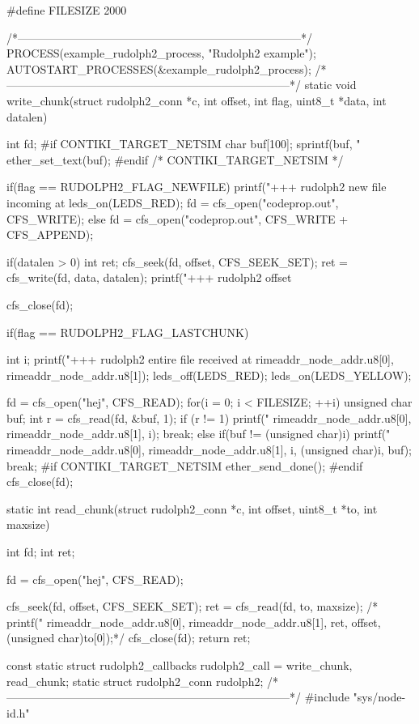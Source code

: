 \begin{DoxyCodeInclude}
#define FILESIZE 2000

/*---------------------------------------------------------------------------*/
PROCESS(example_rudolph2_process, "Rudolph2 example");
AUTOSTART_PROCESSES(&example_rudolph2_process);
/*---------------------------------------------------------------------------*/
static void
write_chunk(struct rudolph2_conn *c, int offset, int flag,
            uint8_t *data, int datalen)
{
  int fd;
#if CONTIKI_TARGET_NETSIM
  {
    char buf[100];
    sprintf(buf, "%
    ether_set_text(buf);
  }
#endif /* CONTIKI_TARGET_NETSIM */

  if(flag == RUDOLPH2_FLAG_NEWFILE) {
    printf("+++ rudolph2 new file incoming at %
    leds_on(LEDS_RED);
    fd = cfs_open("codeprop.out", CFS_WRITE);
  } else {
    fd = cfs_open("codeprop.out", CFS_WRITE + CFS_APPEND);
  }
  
  if(datalen > 0) {
    int ret;
    cfs_seek(fd, offset, CFS_SEEK_SET);
    ret = cfs_write(fd, data, datalen);
    printf("+++ rudolph2 offset %
  }

  cfs_close(fd);

  if(flag == RUDOLPH2_FLAG_LASTCHUNK) {
    int i;
    printf("+++ rudolph2 entire file received at %
           rimeaddr_node_addr.u8[0], rimeaddr_node_addr.u8[1]);
    leds_off(LEDS_RED);
    leds_on(LEDS_YELLOW);

    fd = cfs_open("hej", CFS_READ);
    for(i = 0; i < FILESIZE; ++i) {
      unsigned char buf;
      int r = cfs_read(fd, &buf, 1);
      if (r != 1) {
        printf("%
               rimeaddr_node_addr.u8[0], rimeaddr_node_addr.u8[1],
               i);
        break;
      }       
      else if(buf != (unsigned char)i) {
        printf("%
               rimeaddr_node_addr.u8[0], rimeaddr_node_addr.u8[1],
               i, (unsigned char)i, buf);
        break;
      }
    }
#if CONTIKI_TARGET_NETSIM
    ether_send_done();
#endif
    cfs_close(fd);
  }
}
static int
read_chunk(struct rudolph2_conn *c, int offset, uint8_t *to, int maxsize)
{
  int fd;
  int ret;
  
  fd = cfs_open("hej", CFS_READ);

  cfs_seek(fd, offset, CFS_SEEK_SET);
  ret = cfs_read(fd, to, maxsize);
  /*  printf("%
         rimeaddr_node_addr.u8[0], rimeaddr_node_addr.u8[1],
         ret, offset, (unsigned char)to[0]);*/
  cfs_close(fd);
  return ret;
}
const static struct rudolph2_callbacks rudolph2_call = {write_chunk,
                                                        read_chunk};
static struct rudolph2_conn rudolph2;
/*---------------------------------------------------------------------------*/
#include "sys/node-id.h"


\end{DoxyCodeInclude}
